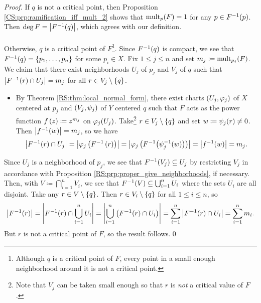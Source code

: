 \documentclass[../Moduli_Spaces_of_Riemann_Surfaces.tex]{subfiles}
\begin{document}
    \begin{proof}
        If $q$ is not a critical point, then Proposition \ref{CS:prp:ramification_iff_mult_2} shows that $\operatorname{mult}_p\!\left(F\right)=1$ for any $p\in F^{-1}\!\left(p\right)$. Then $\deg F=\left|F^{-1}\!\left(q\right)\right|$, which agrees with our definition.\\\ \\
        Otherwise, $q$ is a critical point of $F$\footnote{Although $q$ is a critical point of $F$, every point in a small enough neighborhood around it is not a critical point.}. Since $F^{-1}\!\left(q\right)$ is compact, we see that $F^{-1}\!\left(q\right)=\left\{p_1,\dots,p_n\right\}$ for some $p_i\in X$. Fix $1\leq j\leq n$ and set $m_j\coloneqq\operatorname{mult}_{p_j}\!\left(F\right)$. We claim that there exist neighborhoods $U_j$ of $p_j$ and $V_j$ of $q$ such that $\left|F^{-1}\!\left(r\right)\cap U_j\right|=m_j$ for all $r\in V_j\setminus\left\{q\right\}$.
        \begin{itemize}
            \item By Theorem \ref{RS:thm:local_normal_form}, there exist charts $\left(U_j,\varphi_j\right)$ of $X$ centered at $p_j$ and $\left(V_j,\psi_j\right)$ of $Y$ centered $q$ such that $F$ acts as the power function $f\left(z\right)\coloneqq z^{m_j}$ on $\varphi_j\!\left(U_j\right)$. Take\footnote{Note that $V_j$ can be taken small enough so that $r$ is \textit{not} a critical value of $F$.} $r\in V_j\setminus\left\{q\right\}$ and set $w\coloneqq\psi_j\!\left(r\right)\neq0$. Then $\left|f^{-1}\!\left(w\right)\right|=m_j$, so we have
                \begin{equation*}
                    \left|F^{-1}\!\left(r\right)\cap U_j\right|=\left|\varphi_j\left(F^{-1}\left(r\right)\right)\right|=\left|\varphi_j\left(F^{-1}\!\left(\psi_j^{-1}\!\left(w\right)\right)\right)\right|=\left|f^{-1}\!\left(w\right)\right|=m_j.
                \end{equation*}
        \end{itemize}
        Since $U_j$ is a neighborhood of $p_j$, we see that $F^{-1}\!\left(V_j\right)\subseteq U_j$ by restricting $V_j$ in accordance with Proposition \ref{RS:prp:proper_give_neighborhoods}, if necessary. Then, with $V\coloneqq\bigcap_{i=1}^{n}V_i$, we see that $F^{-1}\!\left(V\right)\subseteq\bigcup_{i=1}^{n}U_i$ where the sets $U_i$ are all disjoint. Take any $r\in V\setminus\left\{q\right\}$. Then $r\in V_i\setminus\left\{q\right\}$ for all $1\leq i\leq n$, so
        \begin{equation*}
            \left|F^{-1}\!\left(r\right)\right|=\left|F^{-1}\!\left(r\right)\cap\bigcup_{i=1}^{n}U_i\right|=\left|\bigcup_{i=1}^{n}\left(F^{-1}\!\left(r\right)\cap U_i\right)\right|=\sum_{i=1}^{n}\left|F^{-1}\!\left(r\right)\cap U_i\right|=\sum_{i=1}^{n}m_i.
        \end{equation*}
        But $r$ is not a critical point of $F$, so the result follows.\qed
    \end{proof}
\end{document}
